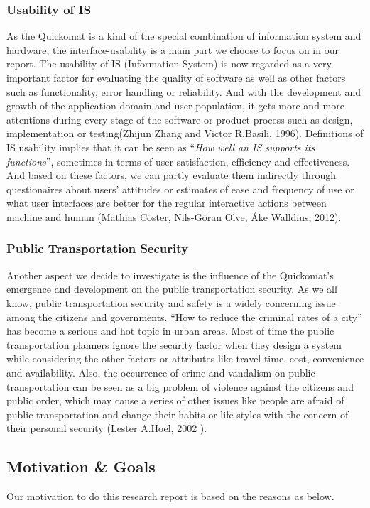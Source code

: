 \documentclass[twocolumn]{article}
\begin{document}
\subsubsection{Usability of IS}
As the Quickomat is a kind of the special combination of information system and hardware, the interface-usability is a main part we choose to focus on in our report. The usability of IS (Information System) is now regarded as a very important factor for evaluating the quality of software as well as other factors such as  functionality, error handling or reliability. And with the development and growth of the application domain and user population, it gets more and more attentions during every stage of the software or product process such as design, implementation or testing(Zhijun Zhang and Victor R.Basili, 1996). Definitions of IS usability implies that it can be seen as  “\emph{How well an IS supports its functions}”, sometimes in terms of user satisfaction, efficiency and effectiveness. And based on these factors, we can partly evaluate them indirectly through questionaires about users’ attitudes or estimates of ease and frequency of use or what user interfaces are better for the regular interactive actions between machine and human (Mathias Cöster, Nils-Göran Olve, Åke Walldius, 2012).

\subsubsection{Public Transportation Security}
Another aspect we decide to investigate is the influence of the Quickomat’s emergence and development on the public transportation security. As we all know, public transportation security and safety is a widely concerning issue among the citizens and governments. “How to reduce the criminal rates of a city” has become a serious and hot topic in urban areas. Most of time the public transportation planners ignore the security factor when they design a system while considering the other factors or attributes like travel time, cost, convenience and availability.  Also, the occurrence of crime and vandalism on public transportation can be seen as a big problem of violence against the citizens and public order, which may cause a series of other issues like people are afraid of public transportation and change their habits or life-styles with the concern of their personal security (Lester A.Hoel, 2002 ). 

\subsection{Motivation \& Goals}
Our motivation to do this research report is based on the reasons as below.
\end{document}
